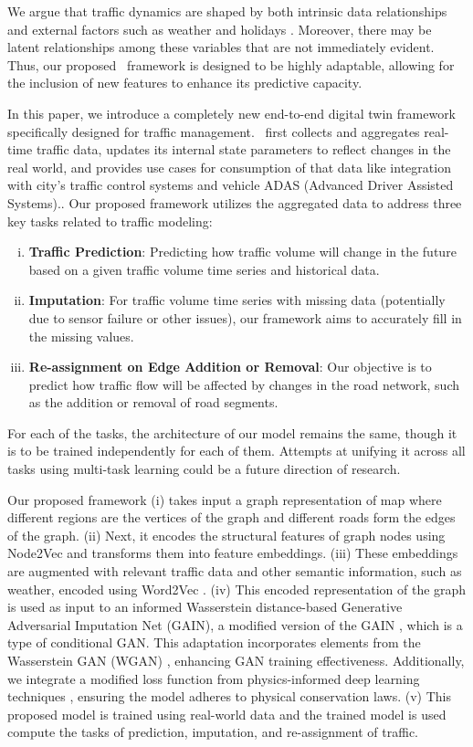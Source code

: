We argue that traffic dynamics are shaped by both intrinsic data relationships and external factors such as weather \cite{weather} and holidays \cite{holiday}. Moreover, there may be latent relationships among these variables that are not immediately evident. Thus, our proposed \name\ framework is designed to be highly adaptable, allowing for the inclusion of new features to enhance its predictive capacity.

In this paper, we introduce a completely new end-to-end digital twin framework specifically designed for traffic management. \name\ first collects and aggregates real-time traffic data, updates its internal state parameters to reflect changes in the real world, and provides use cases for consumption of that data like integration with city's traffic control systems and vehicle ADAS (Advanced Driver Assisted Systems).. Our proposed framework utilizes the aggregated data to address three key tasks related to traffic modeling:
\begin{enumerate}[(i)]
\item \textbf{Traffic Prediction}: Predicting how traffic volume will change in the future based on a given traffic volume time series and historical data.
\item \textbf{Imputation}: For traffic volume time series with missing data (potentially due to sensor failure or other issues), our framework aims to accurately fill in the missing values.
\item \textbf{Re-assignment on Edge Addition or Removal}: Our objective is to predict how traffic flow will be affected by changes in the road network, such as the addition or removal of road segments.
\end{enumerate}
For each of the tasks, the architecture of our model remains the same, though it is to be trained independently for each of them. Attempts at unifying it across all tasks using multi-task learning could be a future direction of research.

Our proposed framework (i) takes input a graph representation of map where different regions are the vertices of the graph and different roads form the edges of the graph. (ii) Next, it encodes the structural features of graph nodes using Node2Vec \cite{node2vec} and  transforms them into feature embeddings. (iii) These embeddings are augmented with relevant traffic data and other semantic information, such as weather, encoded using Word2Vec \cite{word2vec}.
(iv) This encoded representation of the graph is used as input to an informed Wasserstein distance-based Generative Adversarial Imputation Net (GAIN), a modified version of the GAIN \cite{gain}, which is a type of conditional GAN. This adaptation incorporates elements from the Wasserstein GAN (WGAN) \cite{wgan}, enhancing GAN training effectiveness. Additionally, we integrate a modified loss function from physics-informed deep learning techniques \cite{pidl}, ensuring the model adheres to physical conservation laws.
(v) This proposed model is trained using real-world data and the trained model is used compute the tasks of prediction, imputation, and re-assignment of traffic.

